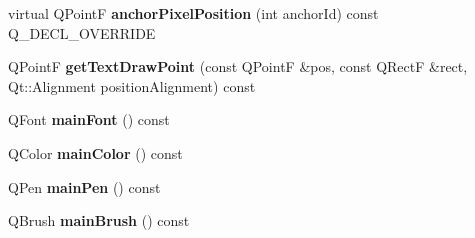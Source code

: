 \begin{DoxyCompactItemize}
\item 
virtual Q\+PointF {\bfseries anchor\+Pixel\+Position} (int anchor\+Id) const Q\+\_\+\+D\+E\+C\+L\+\_\+\+O\+V\+E\+R\+R\+I\+DE\hypertarget{class_q_c_p_item_text_a383963bea5a2e7b27759b0115d3d5c36}{}\label{class_q_c_p_item_text_a383963bea5a2e7b27759b0115d3d5c36}

\item 
Q\+PointF {\bfseries get\+Text\+Draw\+Point} (const Q\+PointF \&pos, const Q\+RectF \&rect, Qt\+::\+Alignment position\+Alignment) const \hypertarget{class_q_c_p_item_text_aa6e478b1ce198eace89157c4cacc3ddc}{}\label{class_q_c_p_item_text_aa6e478b1ce198eace89157c4cacc3ddc}

\item 
Q\+Font {\bfseries main\+Font} () const \hypertarget{class_q_c_p_item_text_a23d391bd6471c45e73f45add67ede902}{}\label{class_q_c_p_item_text_a23d391bd6471c45e73f45add67ede902}

\item 
Q\+Color {\bfseries main\+Color} () const \hypertarget{class_q_c_p_item_text_ad7bf17e4945cc86bbf9a36331da059a0}{}\label{class_q_c_p_item_text_ad7bf17e4945cc86bbf9a36331da059a0}

\item 
Q\+Pen {\bfseries main\+Pen} () const \hypertarget{class_q_c_p_item_text_a9ade32d362b22853659201c738269e2a}{}\label{class_q_c_p_item_text_a9ade32d362b22853659201c738269e2a}

\item 
Q\+Brush {\bfseries main\+Brush} () const \hypertarget{class_q_c_p_item_text_a10d6585a030633aa79d5ebc5a437f183}{}\label{class_q_c_p_item_text_a10d6585a030633aa79d5ebc5a437f183}

\end{DoxyCompactItemize}
